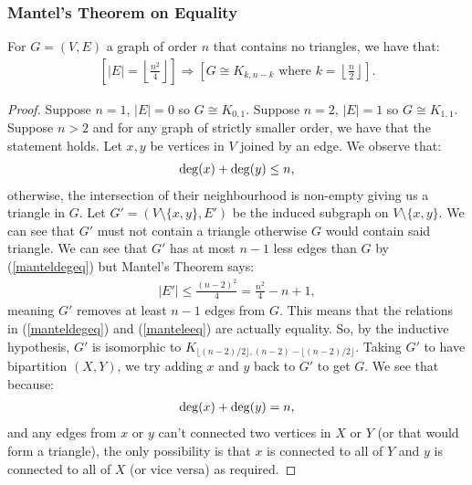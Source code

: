 \subsubsection{Mantel's Theorem on Equality}

For $G = (V, E)$ a graph of order $n$ that contains no triangles, we have that:
\begin{gather*}
    \left[ |E| = \left\lfloor \frac{n^2}{4} \right\rfloor \right]
    \Rightarrow
    \left[ G \cong K_{k, n - k} \text{ where } k = \left\lfloor \frac{n}{2} \right\rfloor \right].
\end{gather*}
\begin{proof}
    Suppose $n = 1$, $|E| = 0$ so $G \cong K_{0, 1}$.
    Suppose $n = 2$, $|E| = 1$ so $G \cong K_{1, 1}$.
    Suppose $n > 2$ and for any graph of strictly smaller order, we have that
    the statement holds. Let $x, y$ be vertices in $V$ joined by an edge. We
    observe that: \begin{gather} \label{manteldegeq}
        \operatorname{deg}(x) + \operatorname{deg}(y) \leq n,
    \end{gather} otherwise, the intersection of their neighbourhood is 
    non-empty giving us a triangle in $G$. Let $G' = (V \setminus \{x, y\}, E')$ 
    be the induced subgraph on $V \setminus \{x, y\}$. We can see that 
    $G'$ must not contain a triangle otherwise $G$ would contain said triangle.
    We can see that $G'$ has at most $n - 1$ less edges than $G$ by
    (\ref{manteldegeq}) but Mantel's Theorem says: 
    \begin{gather} \label{manteleeq} 
        |E'| \leq \frac{(n - 2)^2}{4} = \frac{n^2}{4} - n + 1,
    \end{gather} meaning $G'$ removes at least $n - 1$ edges from $G$.
    This means that the relations in (\ref{manteldegeq}) and (\ref{manteleeq}) 
    are actually equality. So, by the inductive hypothesis, $G'$ is isomorphic
    to $K_{\lfloor(n - 2)/2\rfloor, (n - 2) - \lfloor(n - 2)/2\rfloor}$. Taking 
    $G'$ to have bipartition $(X, Y)$, we try adding $x$ and $y$ back to $G'$ to 
    get $G$. We see that because: \begin{gather*}
        \operatorname{deg}(x) + \operatorname{deg}(y) = n,
    \end{gather*} and any edges from $x$ or $y$ can't connected two vertices
    in $X$ or $Y$ (or that would form a triangle), the only possibility is 
    that $x$ is connected to all of $Y$ and $y$ is connected to all of $X$ 
    (or vice versa) as required.
\end{proof}